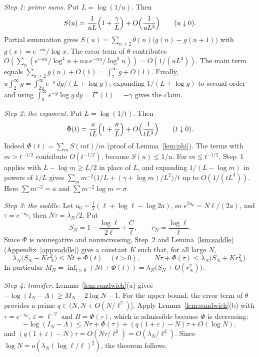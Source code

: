 \documentclass[11pt]{article}
\theoremstyle{remark}
\begin{document}
\emph{Step 1: prime sums.} Put $L=\log(1/u)$. Then
\[
  S(u)=\frac1{uL}\Bigl(1+\frac{\gamma}{L}\Bigr)+O\Bigl(\frac1{uL^3}\Bigr)
  \qquad(u\downarrow0).
\]
Partial summation gives
$S(u)=\sum_{n\ge2}\theta(n)\bigl(g(n)-g(n+1)\bigr)$ with
$g(x)=e^{-xu}/\log x$. The error term of $\theta$ contributes
$O(\sum_n(e^{-nu}/\log^4n+nu\,e^{-nu}/\log^3n))=O(1/(uL^3))$. The main
term equals $\sum_{n\ge2}g(n)+O(1)=\int_2^\infty g+O(1)$. Finally,
$u\int_2^\infty g=\int_{2u}^\infty e^{-y}\,dy/(L+\log y)$; expanding
$1/(L+\log y)$ to second order and using
$\int_0^\infty e^{-y}\log y\,dy=\Gamma'(1)=-\gamma$ gives the claim.

\emph{Step 2: the exponent.} Put $L=\log(1/t)$. Then
\[
  \Phi(t)=\frac{a}{tL}\Bigl(1+\frac{\kappa}{L}\Bigr)+O\Bigl(\frac1{tL^3}\Bigr)
  \qquad(t\downarrow0).
\]
Indeed $\Phi(t)=\sum_mS(mt)/m$ (proof of Lemma~\ref{lem:phi}). The terms
with $m>t^{-1/2}$ contribute $O(t^{-1/2})$, because $S(u)\le1/u$. For
$m\le t^{-1/2}$, Step~1 applies with $L-\log m\ge L/2$ in place of $L$,
and expanding $1/(L-\log m)$ in powers of $1/L$ gives
$\sum_m m^{-2}\bigl(1/L+(\gamma+\log m)/L^2\bigr)/t$ up to
$O(1/(tL^3))$. Here $\sum m^{-2}=a$ and $\sum m^{-2}\log m=\sigma$.

\emph{Step 3: the saddle.} Let $u_0=\frac12(\ell+\log\ell-\log2a)$, so
$e^{2u_0}=N\ell/(2a)$, and $\tau=e^{-u_0}$; then $N\tau=\lambda_N/2$. Put
\[
  S_N=1-\frac{\log\ell}{2\ell}+\frac{C}{\ell},\qquad
  r_N=\frac{\log\ell}{\ell}.
\]
Since $\Phi$ is nonnegative and nonincreasing, Step~2 and
Lemma~\ref{lem:saddle} (Appendix~\ref{app:saddle}) give a constant $K$
such that, for all large $N$,
\[
  \lambda_N\bigl(S_N-Kr_N^2\bigr)\le Nt+\Phi(t)\quad(t>0),\qquad
  N\tau+\Phi(\tau)\le\lambda_N\bigl(S_N+Kr_N^2\bigr).
\]
In particular $M_N=\inf_{t>0}(Nt+\Phi(t))=\lambda_N\bigl(S_N+O(r_N^2)\bigr)$.

\emph{Step 4: transfer.} Lemma~\ref{lem:sandwich}(a) gives
$-\log(I_N-\Lambda)\ge M_N-2\log N-1$. For the upper bound, the error
term of $\theta$ provides a prime $q\in(N,N+O(N/\ell^2)]$. Apply
Lemma~\ref{lem:sandwich}(b) with $\tau=e^{-u_0}$, $\varepsilon=\ell^{-2}$
and $B=\Phi(\tau)$, which is admissible because $\Phi$ is decreasing:
\[
  -\log(I_N-\Lambda)\le N\tau+\Phi(\tau)+(q(1+\varepsilon)-N)\tau
  +O(\log N),
\]
and $(q(1+\varepsilon)-N)\tau=O(N\tau/\ell^2)=O(\lambda_N/\ell^2)$.
Since $\log N=o(\lambda_N(\log\ell/\ell)^2)$, the theorem follows.
\end{document}
